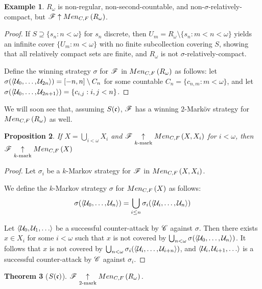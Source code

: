 \documentclass{amsart}
\newtheorem{theorem}{Theorem}[section]
\newtheorem{proposition}[theorem]{Proposition}
\theoremstyle{definition}
\newtheorem{example}[theorem]{Example}
\begin{document}
\begin{example}
  \(R_\omega\) is non-regular, non-second-countable, and
  non-\(\sigma\)-relatively-compact, but \(\mathscr{F}\uparrow Men_{C,F}\left({R_\omega}\right)\).
\end{example}

\begin{proof}
  If \(S\supseteq\{s_n:n<\omega\}\) for \(s_n\)
  discrete, then \(U_m=R_\omega\setminus\{s_n:m<n<\omega\}\) yields an
  infinite cover \(\{U_m:m<\omega\}\) with no finite subcollection covering \(S\),
  showing that all relatively compact sets are finite, and \(R_\omega\) is not
  \(\sigma\)-relatively-compact.

  Define the winning strategy \(\sigma\) for \(\mathscr{F}\) in \(Men_{C,F}\left({R_\omega}\right)\) as
  follows: let \(\sigma(\langle\mathcal{U}_0,\dots,\mathcal{U}_{2n}\rangle)=[-n,n]\setminus C_n\)
  for some countable \(C_n=\{c_{n,m}: m<\omega\}\),
  and let \(\sigma(\langle\mathcal{U}_0,\dots,\mathcal{U}_{2n+1}\rangle)=\{c_{i,j} : i,j < n\}\).
\end{proof}

We will soon see that, assuming \(S(\mathfrak{c})\), \(\mathscr{F}\) has a winning
\(2\)-Mark\"ov strategy for \(Men_{C,F}\left({R_\omega}\right)\) as well.

\begin{proposition}
  If \(X=\bigcup_{i<\omega} X_i\) and \(\mathscr{F} \underset{k\text{-mark}}{\uparrow} Men_{C,F}\left({X,X_i}\right)\)
  for \(i<\omega\), then \(\mathscr{F} \underset{k\text{-mark}}{\uparrow} Men_{C,F}\left({X}\right)\)
\end{proposition}

\begin{proof}
  Let \(\sigma_i\) be a \(k\)-Markov strategy
  for \(\mathscr{F}\) in \(Men_{C,F}\left({X,X_i}\right)\).

  We define the \(k\)-Markov strategy
  \(\sigma\) for \(Men_{C,F}\left({X}\right)\) as follows:
    \[
      \sigma(\langle\mathcal{U}_0,\dots,\mathcal{U}_n\rangle)
        =
      \bigcup_{i\leq n}
      \sigma_i(\langle\mathcal{U}_i,\dots,\mathcal{U}_n\rangle)
    \]

  Let \(\<\mc U_0,\mc U_1,\dots\>\) be a successful counter-attack by \(\mathscr{C}\)
  against \(\sigma\). Then there exists \(x\in X_i\) for
  some \(i<\omega\) such that \(x\) is not covered by
  \(\bigcup_{n<\omega}\sigma(\langle\mathcal{U}_0,\dots,\mathcal{U}_n\rangle)\).
  It follows that \(x\) is not covered by
  \(\bigcup_{n<\omega}\sigma_i(\langle\mathcal{U}_i,\dots,\mathcal{U}_{i+n}\rangle)\),
  and \(\<\mc U_i,\mc U_{i+1},\dots\>\) is a successful counter-attack
  by \(\mathscr{C}\) against \(\sigma_i\).
\end{proof}

\begin{theorem}[\(S(\mathfrak{c})\)]
  \(\mathscr{F}\underset{2\text{-mark}}{\uparrow}Men_{C,F}\left({R_\omega}\right)\).
\end{theorem}
\end{document}
